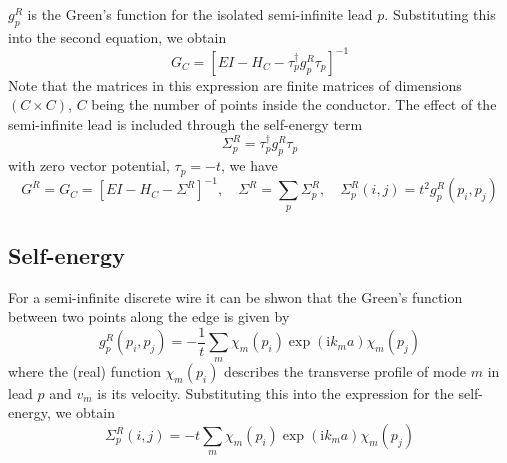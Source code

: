 \documentclass[11pt,a4paper]{book}
\theoremstyle{plain}
\theoremstyle{definition}
\theoremstyle{remark}
\newcommand{\ii}{\mathrm{i}}                      %
\begin{document}
$g^R_p$ is the Green's function for the isolated semi-infinite lead $p$. Substituting this into the second equation, we obtain
\begin{equation}
    G_C = \left[EI - H_C - \tau^\dagger_p g^R_p \tau_p \right]^{-1}
\end{equation}
Note that the matrices in this expression are finite matrices of dimensions $(C\times C)$, $C$ being the number of points inside the conductor. The effect of the semi-infinite lead is included through the self-energy term
\begin{equation} 
    \Sigma^R_p = \tau^\dagger_p g^R_p \tau_p
\end{equation}
with zero vector potential, $\tau_p = -t$, we have
\begin{equation}
    G^R = G_C = [EI - H_C - \Sigma^R]^{-1}, \quad \Sigma^R = \sum_p \Sigma^R_p, \quad \Sigma^R_p(i,j) = t^2 g^R_p(p_i, p_j)
\end{equation}
\subsection{Self-energy}
For a semi-infinite discrete wire it can be shwon that the Green's function between two points along the edge is given by
\begin{equation}
    g^R_p(p_i, p_j) = -\frac{1}{t}\sum_{m}\chi_m(p_i)\exp(\ii k_m a) \chi_m(p_j)
\end{equation}
where the (real) function $\chi_m(p_i)$ describes the transverse profile of mode $m$ in lead $p$ and $v_m$ is its velocity. Substituting this into the expression for the self-energy, we obtain
\begin{equation}
    \Sigma^R_p(i,j) = -t \sum_m \chi_m(p_i) \exp(\ii k_m a) \chi_m(p_j)
\end{equation}
\end{document}
